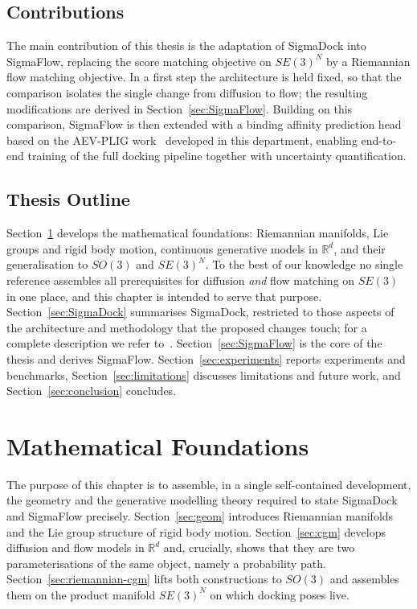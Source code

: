 \documentclass[a4paper,12pt]{article}
\theoremstyle{remark}
\begin{document}
\subsection{Contributions}

The main contribution of this thesis is the adaptation of SigmaDock into SigmaFlow,
replacing the score matching objective on $SE(3)^N$ by a Riemannian flow matching
objective. In a first step the architecture is held fixed, so that the comparison
isolates the single change from diffusion to flow; the resulting modifications are
derived in Section~\ref{sec:SigmaFlow}. Building on this comparison, SigmaFlow is
then extended with a binding affinity prediction head based on the AEV-PLIG
work~\cite{bortoliRiemannianScoreBasedGenerative2022} developed in this department, enabling end-to-end training of
the full docking pipeline together with uncertainty quantification.

\subsection{Thesis Outline}

Section~\ref{sec:math} develops the mathematical foundations: Riemannian manifolds,
Lie groups and rigid body motion, continuous generative models in $\mathbb{R}^d$, and
their generalisation to $SO(3)$ and $SE(3)^N$. To the best of our knowledge no single
reference assembles all prerequisites for diffusion \emph{and} flow matching on
$SE(3)$ in one place, and this chapter is intended to serve that purpose.
Section~\ref{sec:SigmaDock} summarises SigmaDock, restricted to those aspects of the
architecture and methodology that the proposed changes touch; for a complete
description we refer to~\cite{bortoliRiemannianScoreBasedGenerative2022}. Section~\ref{sec:SigmaFlow} is the core of
the thesis and derives SigmaFlow. Section~\ref{sec:experiments} reports experiments
and benchmarks, Section~\ref{sec:limitations} discusses limitations and future work,
and Section~\ref{sec:conclusion} concludes.


\section{Mathematical Foundations}
\label{sec:math}

The purpose of this chapter is to assemble, in a single self-contained development,
the geometry and the generative modelling theory required to state SigmaDock and
SigmaFlow precisely. Section~\ref{sec:geom} introduces Riemannian manifolds and the
Lie group structure of rigid body motion. Section~\ref{sec:cgm} develops diffusion
and flow models in $\mathbb{R}^d$ and, crucially, shows that they are two
parameterisations of the same object, namely a probability path.
Section~\ref{sec:riemannian-cgm} lifts both constructions to $SO(3)$ and assembles
them on the product manifold $SE(3)^N$ on which docking poses live.
\end{document}
